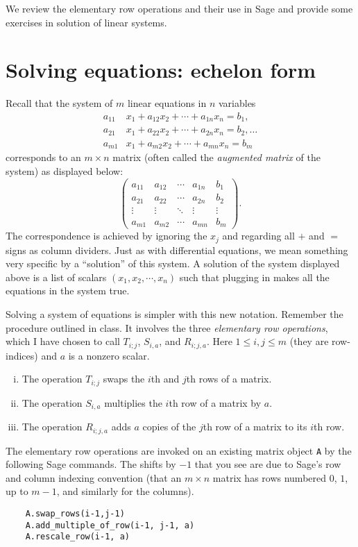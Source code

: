 \documentclass[twocolumn,12pt]{article}
\date{May 1, 2013 (Wed)}
\begin{document}
\makeheader

\begin{summary}
    We review the elementary row operations and their use in Sage and provide some exercises in solution of linear systems.
\end{summary}

\section{Solving equations: echelon form}

Recall that the system of $m$ linear equations in $n$ variables
\begin{align*}
    a_{11} &x_{1} + a_{12} x_{2} + \cdots + a_{1n} x_{n} = b_{1},  \\
    a_{21} &x_{1} + a_{22} x_{2} + \cdots + a_{2n} x_{n} = b_{2},\ldots  \\
    a_{m1} &x_{1} + a_{m2} x_{2} + \cdots + a_{mn} x_{n} = b_{m}
\end{align*}
corresponds to an $m \times n$ matrix (often called the \emph{augmented matrix} of the system) as displayed below: 
\[
    \begin{pmatrix}
        a_{11} & a_{12} & \cdots & a_{1n} & b_1 \\
        a_{21} & a_{22} & \cdots & a_{2n} & b_2 \\
        \vdots & \vdots & \ddots & \vdots & \vdots \\
        a_{m1} & a_{m2} & \cdots & a_{mn} & b_m 
    \end{pmatrix}.
\]
The correspondence is achieved by ignoring the $x_{j}$ and regarding all $+$ and $=$ signs as column dividers. Just as with differential equations, we mean something very specific by a ``solution'' of this system. A solution of the system displayed above is a list of scalars $(x_1, x_2, \cdots, x_n)$ such that plugging in makes all the equations in the system true.

Solving a system of equations is simpler with this new notation. Remember the procedure outlined in class. It involves the three \emph{elementary row operations}, which I have chosen to call $T_{i;j}$, $S_{i,a}$, and $R_{i;j,a}$. Here $1 \leq i, j \leq m$ (they are row-indices) and $a$ is a nonzero scalar.
\begin{enumerate}[(i)]
    \item The operation $T_{i;j}$ swaps the $i$th and $j$th rows of a matrix.
    \item The operation $S_{i,a}$ multiplies the $i$th row of a matrix by $a$.
    \item The operation $R_{i;j,a}$ adds $a$ copies of the $j$th row of a matrix to its $i$th row.
\end{enumerate}
The elementary row operations are invoked on an existing matrix object \lstinline!A! by the following Sage commands. The shifts by $-1$ that you see are due to Sage's row and column indexing convention (that an $m \times n$ matrix has rows numbered $0$, $1$, up to $m-1$, and similarly for the columns).
\begin{lstlisting}
    A.swap_rows(i-1,j-1) 
    A.add_multiple_of_row(i-1, j-1, a)
    A.rescale_row(i-1, a)
\end{lstlisting}
\end{document}
